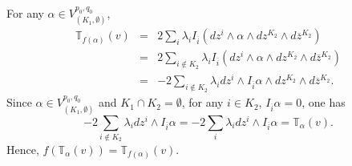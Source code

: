 \documentclass[12pt, reqno]{amsart}
\theoremstyle{plain}
\theoremstyle{definition}
\renewcommand{\bar}{\overline}
\newcommand{\beq}{\begin{equation}}
\newcommand{\eeq}{\end{equation}}
\newcommand{\ee}{\end{eqnarray*}}
\newcommand{\be}{\begin{eqnarray*}}
\renewcommand{\>}{\rightarrow}
\renewcommand{\#}{\sharp}
\numberwithin{equation}{section} %
\begin{document}
\noindent For any $ \alpha \in V_{(K_1,\emptyset)}^{p_0,q_0} $,
\be \mathbb{T}_{f(\alpha)}(v) & = & 2\sum_i \lambda_iI_{\bar i}(dz^i \wedge \alpha \wedge dz^{K_2} \wedge d\bar z{}^{K_2}) \\
& = & 2\sum_{i \notin K_2} \lambda_i I_{\bar i}(dz^i \wedge \alpha \wedge dz^{K_2} \wedge d\bar z{}^{K_2}) \\
& = & -2 \sum_{i \notin K_2} \lambda_i dz^i \wedge I_{\bar i} \alpha \wedge dz^{K_2} \wedge d\bar z{}^{K_2}. \ee
Since $ \alpha \in V_{(K_1,\emptyset)}^{p_0,q_0} $ and $ K_1 \cap K_2 = \emptyset $, for any $ i \in K_2 $,  $ I_{\bar i}\alpha = 0 $, one has
\beq -2 \sum_{i \notin K_2} \lambda_i dz^i \wedge I_{\bar i} \alpha  = -2 \sum_i \lambda_i dz^i \wedge I_{\bar i} \alpha = \mathbb{T}_\alpha(v). \eeq
Hence,  $ f(\mathbb{T}_\alpha(v)) = \mathbb{T}_{f(\alpha)}(v) $. \\
\end{document}
